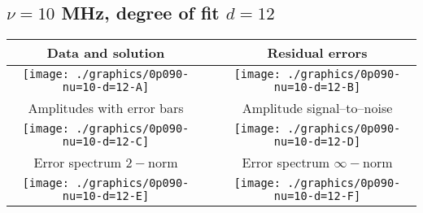 

% 

\clearpage{}
\break{}

\subsection{$\nu = 10$ MHz, degree of fit $d = 12$}

\begin{table}[h]
    \begin{center}
        \begin{tabular}{ccc}
            Data and solution & \quad & Residual errors \\\hline
            \texttt{[image: ./graphics/0p090-nu=10-d=12-A]} &&
            \texttt{[image: ./graphics/0p090-nu=10-d=12-B]} \\[15pt]
            Amplitudes with error bars && Amplitude signal--to--noise \\\hline
            \texttt{[image: ./graphics/0p090-nu=10-d=12-C]} &&
            \texttt{[image: ./graphics/0p090-nu=10-d=12-D]} \\[15pt]
            Error spectrum $2-$norm && Error spectrum $\infty-$norm \\\hline
            \texttt{[image: ./graphics/0p090-nu=10-d=12-E]} &&
            \texttt{[image: ./graphics/0p090-nu=10-d=12-F]} \\[15pt]
        \end{tabular}
    \end{center}
\label{fig:elev=90, nu=10}
\end{table}



\endinput
